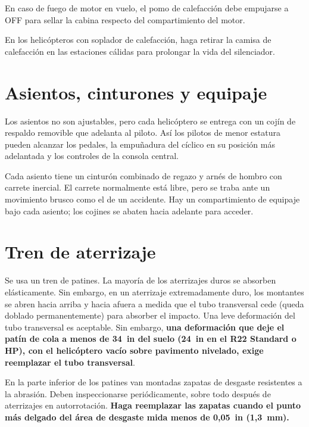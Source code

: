 \begin{precaucion}
En caso de fuego de motor en vuelo, el pomo de calefacción debe empujarse a OFF para sellar la cabina respecto del compartimiento del motor.
\end{precaucion}

\begin{nota}
En los helicópteros con soplador de calefacción, haga retirar la camisa de calefacción en las estaciones cálidas para prolongar la vida del silenciador.
\end{nota}

\section{Asientos, cinturones y equipaje}

Los asientos no son ajustables, pero cada helicóptero se entrega con un cojín de respaldo removible que adelanta al piloto. Así los pilotos de menor estatura pueden alcanzar los pedales, la empuñadura del cíclico en su posición más adelantada y los controles de la consola central.

Cada asiento tiene un cinturón combinado de regazo y arnés de hombro con carrete inercial. El carrete normalmente está libre, pero se traba ante un movimiento brusco como el de un accidente. Hay un compartimiento de equipaje bajo cada asiento; los cojines se abaten hacia adelante para acceder.

\section{Tren de aterrizaje}

Se usa un tren de patines. La mayoría de los aterrizajes duros se absorben elásticamente. Sin embargo, en un aterrizaje extremadamente duro, los montantes se abren hacia arriba y hacia afuera a medida que el tubo transversal cede (queda doblado permanentemente) para absorber el impacto. Una leve deformación del tubo transversal es aceptable. Sin embargo, \textbf{una deformación que deje el patín de cola a menos de 34~in del suelo (24~in en el R22 Standard o HP), con el helicóptero vacío sobre pavimento nivelado, exige reemplazar el tubo transversal}.

En la parte inferior de los patines van montadas zapatas de desgaste resistentes a la abrasión. Deben inspeccionarse periódicamente, sobre todo después de aterrizajes en autorrotación. \textbf{Haga reemplazar las zapatas cuando el punto más delgado del área de desgaste mida menos de 0,05~in (1,3~mm).}

